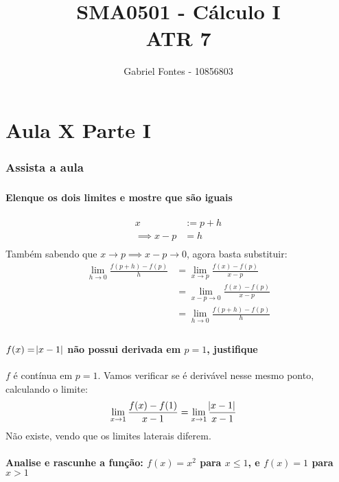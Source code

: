 \documentclass[12pt]{article}
\title{SMA0501 - Cálculo I \\ ATR 7}%
\author{Gabriel Fontes - 10856803}%
\theoremstyle{definition}
\begin{document}
\maketitle
\part{Aula X Parte I}
\setcounter{section}{0}
\section{Assista a aula}

\section{}
\subsection{Elenque os dois limites e mostre que são iguais}
\begin{align*}
    x &:= p+h \\
    \implies x-p &= h \\
\end{align*}
Também sabendo que \(x\rightarrow p \implies x-p \rightarrow 0\), agora basta substituir:
\begin{align*}
    \lim_{h\rightarrow0}\frac{f(p+h)-f(p)}{h}
    &= \lim_{x\rightarrow p}\frac{f(x)-f(p)}{x-p} \\
    &= \lim_{x-p\rightarrow 0}\frac{f(x)-f(p)}{x-p} \\
    &= \lim_{h\rightarrow 0}\frac{f(p+h)-f(p)}{h} \\
\end{align*}
\subsection{\(f(x) = \abs{x-1}\) não possui derivada em \(p=1\), justifique}
\(f\) é contínua em \(p = 1\). Vamos verificar se é derivável nesse mesmo ponto, calculando o limite:
\begin{align*}
    \lim_{x\rightarrow 1}\frac{f(x)-f(1)}{x-1}
    &= \lim_{x\rightarrow 1}\frac{\abs{x-1}}{x-1}
\end{align*}
Não existe, vendo que os limites laterais diferem.
\subsection{Analise e rascunhe a função: \(f(x)=x^2\) para \(x \leq 1\), e \(f(x)=1\) para \(x > 1\)}
\end{document}
